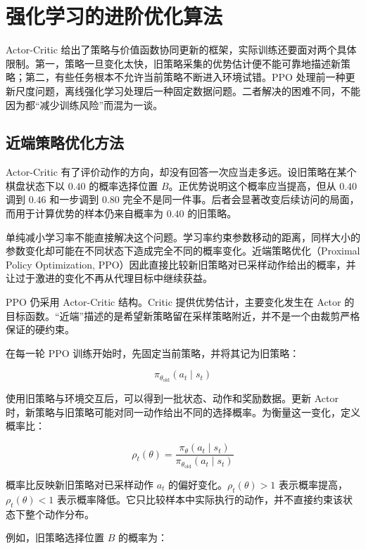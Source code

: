 \documentclass[UTF8,a4paper,zihao=-4,oneside,openany]{ctexbook}
\begin{document}
\section{强化学习的进阶优化算法}
Actor-Critic 给出了策略与价值函数协同更新的框架，实际训练还要面对两个具体限制。第一，策略一旦变化太快，旧策略采集的优势估计便不能可靠地描述新策略；第二，有些任务根本不允许当前策略不断进入环境试错。PPO 处理前一种更新尺度问题，离线强化学习处理后一种固定数据问题。二者解决的困难不同，不能因为都“减少训练风险”而混为一谈。

\subsection{近端策略优化方法}

Actor-Critic 有了评价动作的方向，却没有回答一次应当走多远。设旧策略在某个棋盘状态下以 $0.40$ 的概率选择位置 $B$。正优势说明这个概率应当提高，但从 $0.40$ 调到 $0.46$ 和一步调到 $0.80$ 完全不是同一件事。后者会显著改变后续访问的局面，而用于计算优势的样本仍来自概率为 $0.40$ 的旧策略。

单纯减小学习率不能直接解决这个问题。学习率约束参数移动的距离，同样大小的参数变化却可能在不同状态下造成完全不同的概率变化。近端策略优化（Proximal Policy Optimization, PPO）因此直接比较新旧策略对已采样动作给出的概率，并让过于激进的变化不再从代理目标中继续获益。

PPO 仍采用 Actor-Critic 结构。Critic 提供优势估计，主要变化发生在 Actor 的目标函数。“近端”描述的是希望新策略留在采样策略附近，并不是一个由裁剪严格保证的硬约束。

在每一轮 PPO 训练开始时，先固定当前策略，并将其记为旧策略：

\begin{equation}
\pi_{\theta_{\mathrm{old}}}(a_t\mid s_t)
\end{equation}

使用旧策略与环境交互后，可以得到一批状态、动作和奖励数据。更新 Actor 时，新策略与旧策略可能对同一动作给出不同的选择概率。为衡量这一变化，定义概率比：

\begin{equation}
\rho_t(\theta)
=
\frac{
\pi_{\theta}(a_t\mid s_t)
}{
\pi_{\theta_{\mathrm{old}}}(a_t\mid s_t)
}
\end{equation}

概率比反映新旧策略对已采样动作 $a_t$ 的偏好变化。$\rho_t(\theta)>1$ 表示概率提高，$\rho_t(\theta)<1$ 表示概率降低。它只比较样本中实际执行的动作，并不直接约束该状态下整个动作分布。

例如，旧策略选择位置 $B$ 的概率为：
\end{document}
